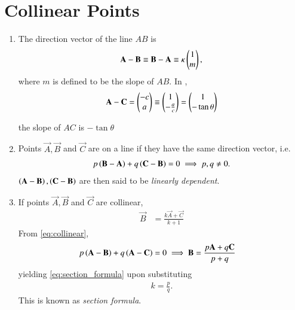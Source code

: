 \section{Collinear Points}
\begin{enumerate}[label=\thesection.\arabic*.,ref=\thesection.\theenumi]
\item The direction vector of the line $AB$ is
\begin{align}
	\mathbf{A}-
	\mathbf{B} \equiv
	\mathbf{B}-
	\mathbf{A} \equiv \kappa \begin{pmatrix}1 \\ m\end{pmatrix},
\label{eq:dir-vec}
\end{align}
where $m$ is defined to be the slope of $AB$.
	In 
, 
\begin{align}
\mathbf{A}-\mathbf{C}
	=  \begin{pmatrix}-c \\ a\end{pmatrix} \equiv \begin{pmatrix}1 \\ -\frac{a}{c}\end{pmatrix} = \begin{pmatrix}1 \\ -\tan \theta\end{pmatrix}
\end{align}

		the slope of $AC$ is $-\tan \theta$
  \item Points $\vec{A},\vec{B}$ and $\vec{C}$ are on a line  if they have the same direction vector, i.e.
\begin{align}
	  \label{eq:collinear}
	p\left(\mathbf{B}-\mathbf{A}\right)
	+ q\left(\mathbf{C}-\mathbf{B}\right) = 0
	\implies p, q \ne 0.
\end{align}
	$\left(\mathbf{A}-\mathbf{B}\right),
	 \left(\mathbf{C}-\mathbf{B}\right)$
		are then said to be {\em linearly dependent}.
		\item If points $\vec{A}, \vec{B}$ and $\vec{C}$ are collinear, 
  \begin{align}
	  \vec{B}&= \frac{k\vec{A}+ \vec{C}}{k+1}
	  \label{eq:section_formula}
  \end{align}
  \solution From  
	  \eqref{eq:collinear},
	\begin{align}
	p\left(\mathbf{A}-\mathbf{B}\right)
		+ q\left(\mathbf{A}-\mathbf{C}\right) &= 0
		\implies \mathbf{B} = \frac{p\mathbf{A}+q\mathbf{C}}{p+q}
\end{align}
yielding 
	  \eqref{eq:section_formula}
	  upon substituting
\begin{align}
	k = \frac{p}{q}.
\end{align}
		This is known as {\em section formula}.


\end{enumerate}
